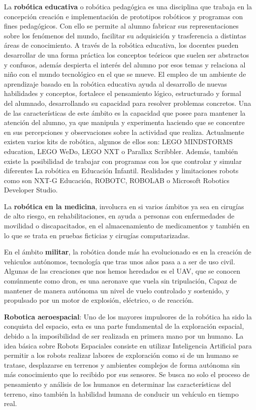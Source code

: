 La \textbf{robótica educativa} o robótica pedagógica es una disciplina que trabaja en la concepción creación e implementación de prototipos robóticos y programas con fines pedagógicos. Con ello se permite al alumno fabricar sus representaciones sobre los fenómenos del mundo, facilitar su adquisición y trasferencia a distintas áreas de conocimiento.
A través de la robótica educativa, los docentes pueden desarrollar de una forma práctica los conceptos teóricos que suelen ser abstractos y confusos, además despierta el interés del alumno por esos temas y relaciona al niño con el mundo tecnológico en el que se mueve. El empleo de un ambiente de aprendizaje basado en la robótica educativa ayuda al desarrollo de nuevas habilidades y conceptos, fortalece el pensamiento lógico, estructurado y formal del alumnado, desarrollando su capacidad para resolver problemas concretos.
Una de las características de este ámbito es la capacidad que posee para mantener la
atención del alumno, ya que manipula y experimenta haciendo que se concentre en sus
percepciones y observaciones sobre la actividad que realiza. Actualmente existen varios kits de robótica, algunos de ellos son: LEGO MINDSTORMS education, LEGO WeDo, LEGO NXT o Parallax Scribbler. Además, también existe la posibilidad de trabajar con programas con los que controlar y simular diferentes La robótica en Educación Infantil. Realidades y limitaciones robots como son NXT-G Educación, ROBOTC, ROBOLAB o Microsoft Robotics Developer Studio.

La \textbf{robótica en la medicina}, involucra en si varios ámbitos ya sea en cirugías de alto riesgo, en rehabilitaciones, en ayuda a personas con enfermedades de movilidad o discapacitados, en el almacenamiento de medicamentos y también en lo que se trata en pruebas ficticias y cirugías computarizadas.

En el ámbito \textbf{militar}, la robótica donde más ha evolucionado es en la creación de vehiculos autónomos, tecnología que tras unos años pasa a a ser de uso civil.
Algunas de las creaciones que nos hemos heredados es el UAV, que se conocen comúnmente como dron, es una aeronave que vuela sin tripulación, Capaz de mantener de manera autónoma un nivel de vuelo controlado y sostenido, y propulsado por un motor de explosión, eléctrico, o de reacción.

\textbf{Robotica aeroespacial}: Uno de los mayores impulsores de la robótica ha sido la conquista del espacio, esta es una parte fundamental de la exploración espacial, debido a la imposibilidad de ser realizada en primera mano por un humano.
La idea básica sobre Robots Espaciales consiste en utilizar Inteligencia Artificial para
permitir a los robots realizar labores de exploración como si de un humano se tratase, desplazarse en terrenos y ambientes complejos de forma autónoma sin más conocimiento que lo recibido por sus sensores. Se busca no solo el proceso de pensamiento y análisis de los humanos en determinar las características del terreno, sino también la habilidad humana de conducir un vehículo en tiempo real.

